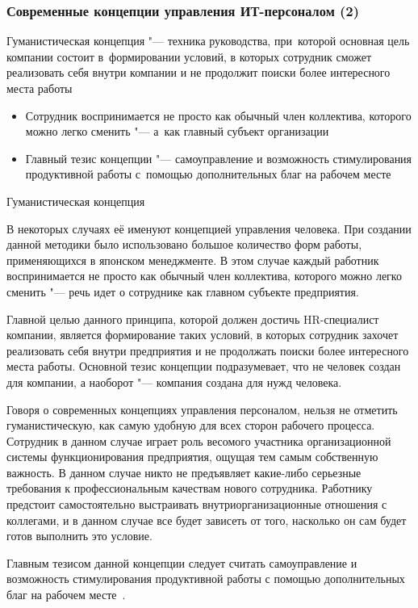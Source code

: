 \documentclass{../industrial-development}
\begin{document}
\begin{frame} \frametitle{Современные концепции управления ИТ-персоналом (2)}
	\alert{Гуманистическая концепция} "--- техника руководства, при~которой основная цель компании состоит в~формировании условий, в которых сотрудник сможет реализовать себя внутри компании и не продолжит поиски более интересного места работы 
	\begin{itemize}
		\item Сотрудник воспринимается не просто как обычный член коллектива, которого можно легко сменить "--- а~как главный субъект организации
		\item Главный тезис концепции "--- самоуправление и возможность стимулирования продуктивной работы с~помощью дополнительных благ на рабочем месте
	\end{itemize}
\end{frame}

\lecturenotes

\alert{Гуманистическая концепция}

В некоторых случаях её именуют концепцией управления человека. При создании данной методики было использовано большое количество форм работы, применяющихся в японском менеджменте. В этом случае каждый работник воспринимается не просто как обычный член коллектива, которого можно легко сменить "--- речь идет о сотруднике как главном субъекте предприятия.

Главной целью данного принципа, которой должен достичь HR-специалист компании, является формирование таких условий, в которых сотрудник захочет реализовать себя внутри предприятия и не продолжать поиски более интересного места работы. Основной тезис концепции подразумевает, что не человек создан для компании, а наоборот "--- компания создана для нужд человека.

Говоря о современных концепциях управления персоналом, нельзя не отметить гуманистическую, как самую удобную для всех сторон рабочего процесса. Сотрудник в данном случае играет роль весомого участника организационной системы функционирования предприятия, ощущая тем самым собственную важность. В данном случае никто не предъявляет какие-либо серьезные требования к профессиональным качествам нового сотрудника. Работнику предстоит самостоятельно выстраивать внутриорганизационные отношения с коллегами, и в данном случае все будет зависеть от того, насколько он сам будет готов выполнить это условие.

Главным тезисом данной концепции следует считать самоуправление и возможность стимулирования продуктивной работы с помощью дополнительных благ на рабочем месте~\cite{Sovrconcept}. 
\end{document}
